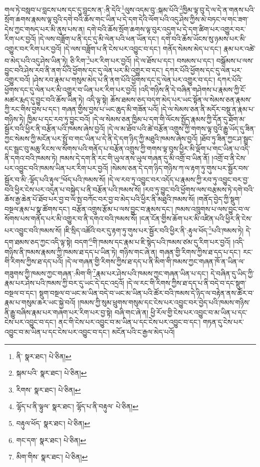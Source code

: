 གལ་ཏེ་བསླབ་པ་བླངས་པས་དང་དུ་བླངས་ན་:ནི་དེའི་\footnote{ནི་  སྣར་ཐང་།  པེ་ཅིན། }ལུས་འདམ་བུ་:སྐམ་པོའི་\footnote{སྐམ་པའི་  སྣར་ཐང་།  པེ་ཅིན། }ཁྱིམ་ལྟ་བུ་དེ་ལ་དེ་ན་གནས་པའི་སྲོག་ཆགས་རྣམས་ལྟ་བུའི་དགེ་བའི་ཆོས་གང་ཡིན་པ་དེ་དག་དེའི་ལོག་པའི་འདུ་ཤེས་ཀྱིས་མེ་བཏང་ལ་གང་ཟག་དེས་ཀྱང་གསད་པར་མི་ནུས་པས་ན། དགེ་བའི་ཆོས་སྲོག་ཆགས་ལྟ་བུར་འདུག་པ་དེ་དག་ཚིག་པར་འགྱུར་བར་རིག་པར་བྱའོ། །དེ་ལས་བཟློག་པ་ནི་དང་དུ་མི་ལེན་པའི་ཕན་ཡོན་དང་། དགེ་བའི་ཆོས་ཡོངས་སུ་ཉམས་པར་མི་འགྱུར་བར་རིག་པར་བྱའོ། །དེ་ལས་བཟློག་པ་ནི་ངེས་པར་འབྱུང་བ་དང་། གནོད་སེམས་མེད་པ་དང་། རྣམ་པར་འཚེ་བ་མེད་པའི་འདུ་ཤེས་ཡིན་ཏེ། ཅི་རིག་\footnote{རིགས་  སྣར་ཐང་།  པེ་ཅིན། }པར་རིག་པར་བྱའོ། །དེ་ལ་ཐོས་པ་དང་། བསམས་པ་དང་། བསྒོམས་པ་ལས་བྱུང་བའི་ཤེས་རབ་ནི་ནག་པོའི་ཕྱོགས་དང་དུ་ལེན་པར་མི་འགྱུར་བ་དང་། དཀར་པོའི་ཕྱོགས་དང་དུ་ལེན་པར་འགྱུར་བའོ། །ཤེས་རབ་རྣམ་པ་གསུམ་མེད་པ་ནི་ནག་པོའི་ཕྱོགས་དང་དུ་ལེན་པར་འགྱུར་བ་དང་། དཀར་པོའི་ཕྱོགས་དང་དུ་ལེན་པར་མི་འགྱུར་བ་ཡིན་པར་རིག་པར་བྱའོ། །འདི་གཉིས་ནི་དེ་བཞིན་གཤེགས་པ་རྣམས་ཀྱི་ངོ་མཚར་རྨད་དུ་བྱུང་བའི་ཆོས་ཡིན་ཏེ། འདི་ལྟ་སྟེ། ཆོས་ཐམས་ཅད་བདག་མེད་པར་ཡང་སྟོན་ལ་སེམས་ཅན་རྣམས་ཀྱི་རང་གིས་བྱས་པ་དང་། གཞན་གྱིས་བྱས་པ་ཡང་ཆུད་མི་གཟོན་པའོ། །དེ་ལ་སེམས་ཅན་ནི་མདོར་བསྡུ་ན་རྣམ་པ་གཉིས་ཏེ། ཁྱིམ་པ་དང་རབ་ཏུ་བྱུང་བའོ། །དེ་ལ་སེམས་ཅན་ཁྱིམ་པ་དག་གི་ལོངས་སྤྱོད་རྣམས་ཀྱི་དོན་དུ་ཐོག་མ་སྦྱོར་བའི་ཕྱིར་ནི་བརྩོན་པའི་ཁམས་ཞེས་བྱའོ། །དེ་ལ་མ་ཐོབ་པའི་ཚེ་བརྩོན་འགྲུས་ཀྱི་གགས་ལྟ་བུའི་རྒྱུ་ཡོད་དུ་ཟིན་ཀྱང་སེམས་ཀྱི་མངོན་པར་སྤྲོ་བ་གང་ཡིན་པ་དེ་ནི་དེ་དག་ཉིད་ཀྱི་མཐུའི་ཁམས་ཞེས་བྱའོ། །ཐོབ་ཏུ་ཟིན་ཀྱང་ཤ་སྦྲང་དང་སྦྲང་བུ་མཆུ་རིངས་ལ་སོགས་པའི་གནོད་པ་བརྩོན་འགྲུས་ཀྱི་གགས་ལྟ་བུས་ཕྱིར་མི་ལྡོག་པ་གང་ཡིན་པ་འདི་ནི་དགའ་བའི་ཁམས་ཏེ། ཁམས་དེ་དག་ནི་རང་གི་ཡུལ་ནས་ཡུལ་གཞན་དུ་མི་འགྲོ་བ་ཡིན་ནོ། །འགྲོ་བ་ནི་ངེས་པར་འབྱུང་བའི་ཁམས་ཡིན་པར་རིག་པར་བྱའོ། །སེམས་ཅན་དེ་དག་ཉིད་གཉིས་ཀ་ལ་རྟག་ཏུ་གུས་པར་སྦྱོར་བས་སྦྱོར་བ་མི་:ལྷོད་པའི་རྟུལ་\footnote{ལྷོད་པ་ནི་ལྟུལ་  སྣར་ཐང་། ལྷོད་པ་ནི་བརྟུལ་  པེ་ཅིན། }ཕོད་པའི་ཁམས་སོ། །དེ་ལ་རབ་ཏུ་འབྱུང་བར་འདོད་པ་རྣམས་ཀྱི་རབ་ཏུ་འབྱུང་བར་བྱ་བའི་ཕྱིར་ངེས་པར་འདུན་པ་བསྐྱེད་པ་ནི་བརྩོན་པའི་ཁམས་སོ། །རབ་ཏུ་བྱུང་བའི་ཕྱོགས་ལས་བརྩམས་ཏེ་དགེ་བའི་ཆོས་རྒྱ་ཆེན་པོ་ཐོབ་པར་བྱ་བ་ལ་སྤ་བཀོང་བར་བྱ་བ་མེད་པའི་ཕྱིར་ནི་མཐུའི་ཁམས་སོ། །གནོད་བྱེད་ཀྱི་སྡུག་བསྔལ་རྣམ་པ་སྣ་ཚོགས་དང་། བརྩོན་འགྲུས་རྩོམ་པ་ལས་བྱུང་བ་རྣམས་དང་། ཁམས་འཁྲུགས་པ་ལས་བྱུང་བ་ལ་སོགས་པས་གནོད་པར་མི་འགྱུར་བ་ནི་དགའ་བའི་ཁམས་སོ། །ངན་ངོན་གྱིས་ཆོག་པར་མི་འཛིན་པའི་ཕྱིར་ནི་ངེས་པར་འབྱུང་བའི་ཁམས་སོ། །ཇི་སྲིད་འཚོའི་བར་དུ་རྟག་ཏུ་གུས་པར་སྦྱོར་བའི་ཕྱིར་ནི་:རྟུལ་ཕོད་\footnote{བརྟུལ་ཕོད་  སྣར་ཐང་།  པེ་ཅིན། }པའི་ཁམས་ཏེ། དེ་དག་ཐམས་ཅད་ཀྱང་འདི་ལྟ་སྟེ། བདག་\footnote{གང་དག་  སྣར་ཐང་།  པེ་ཅིན། }གི་ཁམས་དང་རྣམ་པ་ཇི་སྙེད་པའི་ཁམས་ཙམ་དུ་རིག་པར་བྱའོ། །འདི་གཉིས་ནི་ཁམས་རྣམས་ཀྱི་ཁམས་ཐ་དད་པ་ཡིན་ཏེ། གཉིས་གང་ཞེ་ན། གཞན་གྱི་རིགས་ཀྱིས་ཐ་དད་པ་དང་། རང་གི་རིགས་ཀྱིས་ཐ་དད་པའོ། །དེ་ལ་གཞན་གྱི་རིགས་ཀྱིས་ཐ་དད་པ་ནི་མིག་གི་ཁམས་ཀྱང་གཞན་ཁོ་ན་ཡིན་ལ་གཟུགས་ཀྱི་ཁམས་ཀྱང་གཞན་:མིག་གི་\footnote{མིག་གིས་  སྣར་ཐང་།  པེ་ཅིན། }རྣམ་པར་ཤེས་པའི་ཁམས་ཀྱང་གཞན་ཡིན་པ་དང་། དེ་བཞིན་དུ་ཡིད་ཀྱི་རྣམ་པར་ཤེས་པའི་ཁམས་ཀྱི་བར་དུ་ཡང་དེ་དང་འདྲའོ། །དེ་ལ་རང་གི་རིགས་ཀྱིས་ཐ་དད་པ་ནི་བདེ་བ་དང་སྡུག་བསྔལ་བ་དང་། སྡུག་བསྔལ་བ་ཡང་མ་ཡིན་བདེ་བ་ཡང་མ་ཡིན་པའི་ཚོར་བའི་ཁམས་དེ་ཉིད་ལ་བརྟེན་ནས་ཚོར་བ་རྣམ་པ་གསུམ་ཆར་ཡང་སྐྱེ་བའོ། །ཁམས་ཀྱི་སུམ་ཕྲུགས་གསུམ་དང་ངེས་པར་འབྱུང་བར་བྱེད་པའི་ཁམས་གཉིས་ནི་རྒྱུ་བཞིས་རྣམ་པར་གཞག་པར་རིག་པར་བྱ་སྟེ། བཞི་གང་ཞེ་ན། ཕྱི་རོལ་གྱི་ངེས་པར་འབྱུང་བ་མ་ཡིན་པ་དང་ངེས་པར་འབྱུང་བ་དང་། ནང་གི་ངེས་པར་འབྱུང་བ་མ་ཡིན་པ་དང་ངེས་པར་འབྱུང་བ་དང་། གཏན་དུ་ངེས་པར་འབྱུང་བ་མ་ཡིན་པ་དང་ངེས་པར་འབྱུང་བ་དང་། མངོན་པའི་ང་རྒྱལ་མེད་པའོ། 